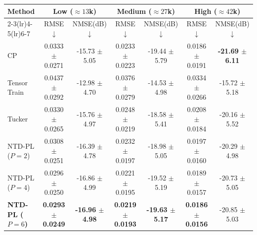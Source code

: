 \begin{tabular*}{\textwidth}{@{\extracolsep{\fill}}l c c c c c c@{}}
\toprule
Method & \multicolumn{2}{c}{Low ($\approx13$k)} & \multicolumn{2}{c}{Medium ($\approx27$k)} & \multicolumn{2}{c}{High ($\approx42$k)} \\
\cmidrule(lr){2-3}\cmidrule(lr){4-5}\cmidrule(lr){6-7}
 & RMSE$\downarrow$ & NMSE(dB)$\downarrow$ & RMSE$\downarrow$ & NMSE(dB)$\downarrow$ & RMSE$\downarrow$ & NMSE(dB)$\downarrow$ \\
\midrule
CP & 0.0333 $\pm$ 0.0271 & -15.73 $\pm$ 5.05 & 0.0233 $\pm$ 0.0223 & -19.44 $\pm$ 5.79 & 0.0186 $\pm$ 0.0191 & \textbf{-21.69 $\pm$ 6.11} \\
Tensor Train & 0.0437 $\pm$ 0.0292 & -12.98 $\pm$ 4.70 & 0.0376 $\pm$ 0.0279 & -14.53 $\pm$ 4.98 & 0.0334 $\pm$ 0.0266 & -15.72 $\pm$ 5.18 \\
Tucker & 0.0330 $\pm$ 0.0265 & -15.76 $\pm$ 4.97 & 0.0248 $\pm$ 0.0219 & -18.58 $\pm$ 5.41 & 0.0208 $\pm$ 0.0184 & -20.16 $\pm$ 5.52 \\
NTD-PL ($P=2$) & 0.0308 $\pm$ 0.0251 & -16.39 $\pm$ 4.78 & 0.0232 $\pm$ 0.0197 & -18.98 $\pm$ 5.05 & 0.0197 $\pm$ 0.0160 & -20.29 $\pm$ 4.98 \\
NTD-PL ($P=4$) & 0.0296 $\pm$ 0.0250 & -16.86 $\pm$ 4.99 & 0.0221 $\pm$ 0.0195 & -19.52 $\pm$ 5.19 & 0.0189 $\pm$ 0.0157 & -20.73 $\pm$ 5.05 \\
\textbf{NTD-PL ($P=6$)} & \textbf{0.0293 $\pm$ 0.0249} & \textbf{-16.96 $\pm$ 4.98} & \textbf{0.0219 $\pm$ 0.0193} & \textbf{-19.63 $\pm$ 5.17} & \textbf{0.0186 $\pm$ 0.0156} & -20.85 $\pm$ 5.03 \\
\bottomrule
\end{tabular*}
